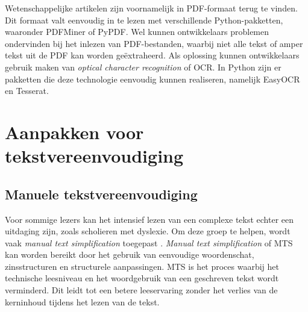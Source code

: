 \medspace

Wetenschappelijke artikelen zijn voornamelijk in PDF-formaat terug te vinden. Dit formaat valt eenvoudig in te lezen met verschillende Python-pakketten, waaronder PDFMiner of PyPDF. Wel kunnen ontwikkelaars problemen ondervinden bij het inlezen van PDF-bestanden, waarbij niet alle tekst of amper tekst uit de PDF kan worden geëxtraheerd. Als oplossing kunnen ontwikkelaars gebruik maken van \textit{optical character recognition} of OCR. In Python zijn er pakketten die deze technologie eenvoudig kunnen realiseren, namelijk EasyOCR en Tesserat.

\section{Aanpakken voor tekstvereenvoudiging}

\subsection{Manuele tekstvereenvoudiging}

Voor sommige lezers kan het intensief lezen van een complexe tekst echter een uitdaging zijn, zoals scholieren met dyslexie. Om deze groep te helpen, wordt vaak \textit{manual text simplification} toegepast \autocite{Siddharthan2014}. \textit{Manual text simplification} of MTS kan worden bereikt door het gebruik van eenvoudige woordenschat, zinsstructuren en structurele aanpassingen. MTS is het proces waarbij het technische leesniveau en het woordgebruik van een geschreven tekst wordt verminderd. Dit leidt tot een betere leeservaring zonder het verlies van de kerninhoud tijdens het lezen van de tekst.


